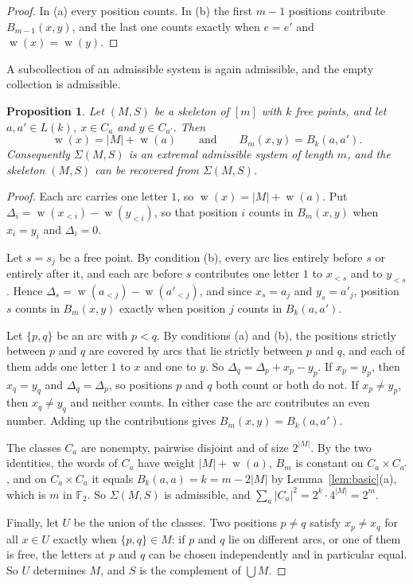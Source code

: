 \documentclass[screen]{aomart}
\newtheorem{proposition}[theorem]{Proposition}
\theoremstyle{definition}
\theoremstyle{remark}
\numberwithin{equation}{section}
\newcommand{\F}{\mathbb{F}}
\DeclareMathOperator{\wt}{w}
\begin{document}
\begin{proof}
In (a) every position counts. In (b) the first $m-1$ positions contribute $B_{m-1}(x,y)$, and the last one counts exactly when $e=e'$ and $\wt(x)=\wt(y)$.
\end{proof}

A subcollection of an admissible system is again admissible, and the empty collection is admissible.

\begin{proposition}\label{prop:skeleton}
Let $(M,S)$ be a skeleton of $[m]$ with $k$ free points, and let $a,a'\in L(k)$, $x\in C_a$ and $y\in C_{a'}$. Then
\[
\wt(x)=|M|+\wt(a)\qquad\text{and}\qquad B_m(x,y)=B_k(a,a').
\]
Consequently $\Sigma(M,S)$ is an extremal admissible system of length $m$, and the skeleton $(M,S)$ can be recovered from $\Sigma(M,S)$.
\end{proposition}

\begin{proof}
Each arc carries one letter $1$, so $\wt(x)=|M|+\wt(a)$. Put $\Delta_i=\wt(x_{<i})-\wt(y_{<i})$, so that position $i$ counts in $B_m(x,y)$ when $x_i=y_i$ and $\Delta_i=0$.

Let $s=s_j$ be a free point. By condition (b), every arc lies entirely before $s$ or entirely after it, and each arc before $s$ contributes one letter $1$ to $x_{<s}$ and to $y_{<s}$. Hence $\Delta_s=\wt(a_{<j})-\wt(a'_{<j})$, and since $x_s=a_j$ and $y_s=a'_j$, position $s$ counts in $B_m(x,y)$ exactly when position $j$ counts in $B_k(a,a')$.

Let $\{p,q\}$ be an arc with $p<q$. By conditions (a) and (b), the positions strictly between $p$ and $q$ are covered by arcs that lie strictly between $p$ and $q$, and each of them adds one letter $1$ to $x$ and one to $y$. So $\Delta_q=\Delta_p+x_p-y_p$. If $x_p=y_p$, then $x_q=y_q$ and $\Delta_q=\Delta_p$, so positions $p$ and $q$ both count or both do not. If $x_p\ne y_p$, then $x_q\ne y_q$ and neither counts. In either case the arc contributes an even number. Adding up the contributions gives $B_m(x,y)=B_k(a,a')$.

The classes $C_a$ are nonempty, pairwise disjoint and of size $2^{|M|}$. By the two identities, the words of $C_a$ have weight $|M|+\wt(a)$, $B_m$ is constant on $C_a\times C_{a'}$, and on $C_a\times C_a$ it equals $B_k(a,a)=k=m-2|M|$ by Lemma~\ref{lem:basic}(a), which is $m$ in $\F_2$. So $\Sigma(M,S)$ is admissible, and $\sum_a|C_a|^2=2^k\cdot 4^{|M|}=2^m$.

Finally, let $U$ be the union of the classes. Two positions $p\ne q$ satisfy $x_p\ne x_q$ for all $x\in U$ exactly when $\{p,q\}\in M$: if $p$ and $q$ lie on different arcs, or one of them is free, the letters at $p$ and $q$ can be chosen independently and in particular equal. So $U$ determines $M$, and $S$ is the complement of $\bigcup M$.
\end{proof}
\end{document}
